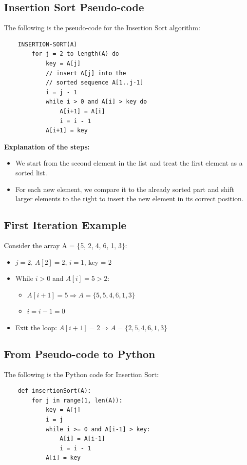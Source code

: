     \subsection{Insertion Sort Pseudo-code}
    The following is the pseudo-code for the Insertion Sort algorithm:
    \begin{verbatim}
    INSERTION-SORT(A)
        for j = 2 to length(A) do
            key = A[j]
            // insert A[j] into the
            // sorted sequence A[1..j-1]
            i = j - 1
            while i > 0 and A[i] > key do
                A[i+1] = A[i]
                i = i - 1
            A[i+1] = key
    \end{verbatim}
    \textbf{Explanation of the steps:}
    \begin{itemize}
        \item We start from the second element in the list and treat the first element as a sorted list.
        \item For each new element, we compare it to the already sorted part and shift larger elements to the right to insert the new element in its correct position.
    \end{itemize}
    
    \subsection{First Iteration Example}
    Consider the array A = \{5, 2, 4, 6, 1, 3\}:
    \begin{itemize}
        \item $j = 2$, $A[2] = 2$, $i = 1$, key = 2
        \item While $i > 0$ and $A[i] = 5 > 2$:
        \begin{itemize}
            \item $A[i+1] = 5 \Rightarrow A = \{5, 5, 4, 6, 1, 3\}$
            \item $i = i-1 = 0$
        \end{itemize}
        \item Exit the loop: $A[i+1] = 2 \Rightarrow A = \{2, 5, 4, 6, 1, 3\}$
    \end{itemize}
    
    \subsection{From Pseudo-code to Python}
    The following is the Python code for Insertion Sort:
    
    \begin{verbatim}
    def insertionSort(A):
        for j in range(1, len(A)):
            key = A[j]
            i = j
            while i >= 0 and A[i-1] > key:
                A[i] = A[i-1]
                i = i - 1
            A[i] = key
    \end{verbatim}
    
